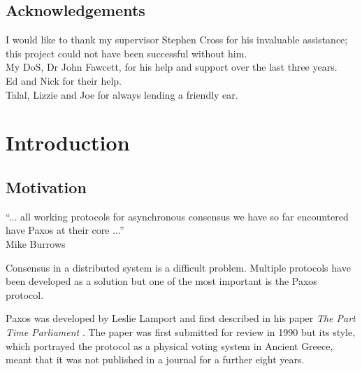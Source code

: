 \documentclass[12pt,twoside,notitlepage]{report}
\newenvironment{myquote}{\list{}{\leftmargin=0.3in\rightmargin=0.3in}\item[]}{\endlist}
\begin{document}
\medskip
{}

\cleardoublepage

\tableofcontents

\listoffigures

\newpage
\section*{Acknowledgements}

I would like to thank my supervisor Stephen Cross for his invaluable assistance; this project
could not have been successful without him. \\
My DoS, Dr John Fawcett, for his help and support over the last three years. \\
Ed and Nick for their help. \\
Talal, Lizzie and Joe for always lending a friendly ear.


\cleardoublepage        %

\setcounter{page}{1}
\pagestyle{headings}

\chapter{Introduction}

\section{Motivation}

\begin{myquote}
``... all working protocols for asynchronous consensus we have so far encountered have Paxos at their
core ...'' \\
Mike Burrows \cite{burrows06}
\end{myquote}

Consensus in a distributed system is a difficult problem. Multiple protocols have been
developed as a solution but one of the most important is the Paxos protocol.

Paxos was developed by Leslie Lamport and first described in his paper \emph{The Part Time
Parliament} \cite{lamport98}.  The paper was first submitted for review in 1990 but its style,
which portrayed the protocol as a physical voting system in Ancient Greece, meant that it was not
published in a journal for a further eight years.
\end{document}
